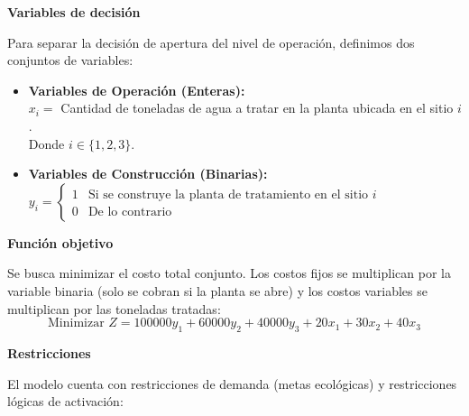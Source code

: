 \documentclass[10pt,a4paper]{article}
\begin{document}
\textbf{Variables de decisión}

Para separar la decisión de apertura del nivel de operación, definimos dos conjuntos de variables:

\begin{itemize}
    \item \textbf{Variables de Operación (Enteras):} \\
    $x_i = $ Cantidad de toneladas de agua a tratar en la planta ubicada en el sitio $i$. \\
    Donde $i \in \{1, 2, 3\}$.
    
    \item \textbf{Variables de Construcción (Binarias):} \\
    $y_i = 
    \begin{cases} 
    1 & \text{Si se construye la planta de tratamiento en el sitio } i \\
    0 & \text{De lo contrario}
    \end{cases}$
\end{itemize}

\vspace{3mm}
\textbf{Función objetivo}

Se busca minimizar el costo total conjunto. Los costos fijos se multiplican por la variable binaria (solo se cobran si la planta se abre) y los costos variables se multiplican por las toneladas tratadas:
\[ \text{Minimizar } Z = 100000y_1 + 60000y_2 + 40000y_3 + 20x_1 + 30x_2 + 40x_3 \]

\vspace{3mm}
\textbf{Restricciones}

El modelo cuenta con restricciones de demanda (metas ecológicas) y restricciones lógicas de activación:
\end{document}
